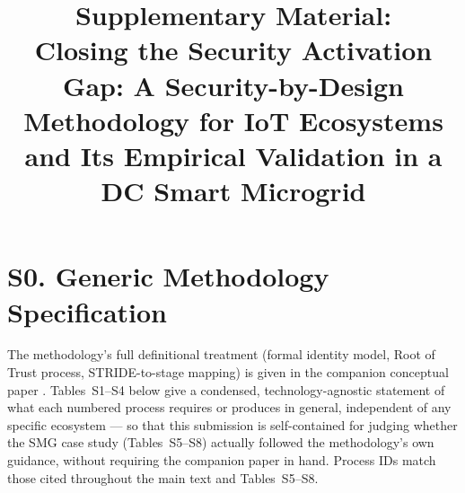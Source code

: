 \documentclass[12pt]{article}
\title{Supplementary Material:\\[4pt]\large Closing the Security Activation Gap: A Security-by-Design Methodology for IoT Ecosystems and Its Empirical Validation in a DC Smart Microgrid}
\author{}
\date{}
\begin{document}
\maketitle
\renewcommand{\thetable}{S\arabic{table}}
\setcounter{table}{0}

\section*{S0. Generic Methodology Specification}
\label{app:generic}

The methodology's full definitional treatment (formal identity model, Root of Trust process, STRIDE-to-stage mapping) is given in the companion conceptual paper \citep{campos2026identity}. Tables~S1--S4 below give a condensed, technology-agnostic statement of what each numbered process requires or produces in general, independent of any specific ecosystem --- so that this submission is self-contained for judging whether the SMG case study (Tables~S5--S8) actually followed the methodology's own guidance, without requiring the companion paper in hand. Process IDs match those cited throughout the main text and Tables~S5--S8.
\end{document}
